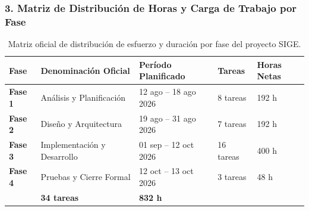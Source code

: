 \documentclass[12pt,a4paper]{article}
\begin{document}
\subsubsection*{3. Matriz de Distribución de Horas y Carga de Trabajo por Fase}
\begin{table}[H]
\centering
\small
\renewcommand{\arraystretch}{1.2}
\begin{tabularx}{\textwidth}{|>{\hsize=0.6\hsize\centering\arraybackslash\bfseries\footnotesize}X|>{\hsize=1.2\hsize\raggedright\arraybackslash\footnotesize}X|>{\hsize=1.1\hsize\centering\arraybackslash\footnotesize}X|>{\hsize=0.5\hsize\centering\arraybackslash\footnotesize}X|>{\hsize=0.6\hsize\centering\arraybackslash\footnotesize}X|}
\hline
\rowcolor{tableheader}
\textbf{Fase} & \textbf{Denominación Oficial} & \textbf{Período Planificado} & \textbf{Tareas} & \textbf{Horas Netas} \\
\hline
Fase 1 & Análisis y Planificación & 12 ago -- 18 ago 2026 & 8 tareas & 192 h \\
\hline
Fase 2 & Diseño y Arquitectura & 19 ago -- 31 ago 2026 & 7 tareas & 192 h \\
\hline
Fase 3 & Implementación y Desarrollo & 01 sep -- 12 oct 2026 & 16 tareas & 400 h \\
\hline
Fase 4 & Pruebas y Cierre Formal & 12 oct -- 13 oct 2026 & 3 tareas & 48 h \\
\hline
\multicolumn{3}{|r|}{\textbf{TOTAL GENERAL DEL PROYECTO:}} & \textbf{34 tareas} & \textbf{832 h} \\
\hline
\end{tabularx}
\caption{Matriz oficial de distribución de esfuerzo y duración por fase del proyecto SIGE.}
\end{table}
\end{document}
